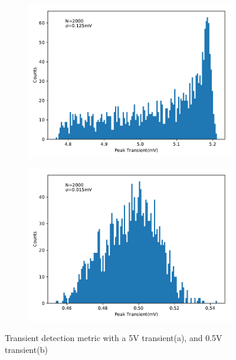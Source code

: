 \begin{figure}[ht!]
    \centering
    \begin{subfigure}{.5\textwidth}
        \centering
        \includegraphics[width=0.9\linewidth]{img/box_eval/5v_transient_rms.pdf}
        \caption{}
        \label{fig:expdes:4:1}
    \end{subfigure}%
    \begin{subfigure}{.5\textwidth}
        \centering
        \includegraphics[width=0.9\linewidth]{img/box_eval/0p5v_transient_rms.pdf}
        \caption{}
        \label{fig:expdes:4:2}
    \end{subfigure}
    \caption{Transient detection metric with a 5V transient(a), and 0.5V transient(b)}
    \label{fig:expdes:4}
\end{figure}

